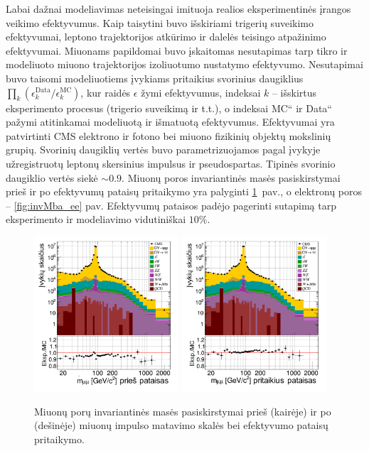 \documentclass[a4paper, 12pt, oneside]{article}
\newcommand{\ltq}[1]{{\quotedblbase{}#1\textquotedblleft{}}}
\newlength\q
\begin{document}
Labai dažnai modeliavimas neteisingai imituoja realios eksperimentinės įrangos veikimo efektyvumus.
Kaip taisytini buvo išskiriami trigerių suveikimo efektyvumai, leptono trajektorijos atkūrimo ir dalelės teisingo
atpažinimo efektyvumai.
Miuonams papildomai buvo įskaitomas nesutapimas tarp tikro ir modeliuoto miuono trajektorijos izoliuotumo nustatymo efektyvumo.
Nesutapimai buvo taisomi modeliuotiems įvykiams pritaikius svorinius daugiklius $\prod_k(\epsilon_k^{\mathrm{Data}}/\epsilon_k^{\mathrm{MC}})$, 
kur raidės $\epsilon$ žymi efektyvumus, indeksai $k$ -- išskirtus eksperimento procesus (trigerio suveikimą ir t.t.),
o indeksai \ltq{MC} ir \ltq{Data} pažymi atitinkamai modeliuotą ir išmatuotą efektyvumus.
Efektyvumai yra patvirtinti CMS elektrono ir fotono bei miuono fizikinių objektų mokslinių grupių.
Svorinių daugiklių vertės buvo parametrizuojamos pagal įvykyje užregistruotų leptonų skersinius impulsus ir pseudospartas.
Tipinės svorinio daugiklio vertės siekė $\sim\!0.9$.
Miuonų poros invariantinės masės pasiskirstymai prieš ir po efektyvumų pataisų pritaikymo yra palyginti \ref{fig:invMba_mumu}~pav.,
o elektronų poros -- \ref{fig:invMba_ee} pav.
Efektyvumų pataisos padėjo pagerinti sutapimą tarp eksperimento ir modeliavimo vidutiniškai $10\%$.
\begin{figure}[b!]
	\RawFloats
	\includegraphics[width=0.48\textwidth]{Magistrinis/mumu_mass_before.png}
	\includegraphics[width=0.48\textwidth]{Magistrinis/mumu_mass_after.png}
	\vspace{-0.3cm}
	\caption{\label{fig:invMba_mumu} Miuonų porų invariantinės masės pasiskirstymai prieš (kairėje) ir po (dešinėje)
	miuonų impulso matavimo skalės bei efektyvumo pataisų pritaikymo.}
\end{figure}
\end{document}
